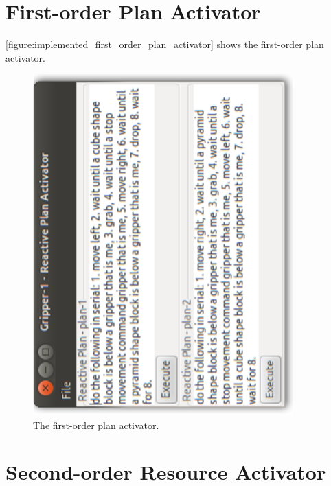 \section{First-order Plan Activator}

{\mbox{\autoref{figure:implemented_first_order_plan_activator}}} shows
the first-order plan activator.
\begin{figure}
\begin{center}
\includegraphics[width=10cm]{gfx/implemented_first_order_plan_activator}
\end{center}
\caption[The first-order plan activator.]{The first-order plan
  activator.}
\label{figure:implemented_first_order_plan_activator}
\end{figure}

\section{Second-order Resource Activator}

